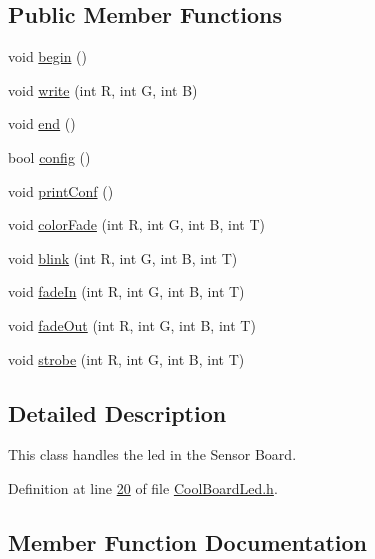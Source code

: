 \subsection*{Public Member Functions}
\begin{DoxyCompactItemize}
\item 
void \hyperlink{class_cool_board_led_ae3cbde8affcc6f011cbd698c8ef911f6}{begin} ()
\item 
void \hyperlink{class_cool_board_led_a30fadd4cbec17ceea428bf7a32207e87}{write} (int R, int G, int B)
\item 
void \hyperlink{class_cool_board_led_a69f323359e0c9f797422f2152b5d41ef}{end} ()
\item 
bool \hyperlink{class_cool_board_led_a1b60e5e30bea96c49ed62ed1bf1ffc8b}{config} ()
\item 
void \hyperlink{class_cool_board_led_a8ed3053a36f0ed4a131f43b5b17efb61}{print\+Conf} ()
\item 
void \hyperlink{class_cool_board_led_a6dbfe23988f43e1242cd05e69b13ff30}{color\+Fade} (int R, int G, int B, int T)
\item 
void \hyperlink{class_cool_board_led_a27706bc029f6a126c55d0b91624ad7fa}{blink} (int R, int G, int B, int T)
\item 
void \hyperlink{class_cool_board_led_aec915442a8441c7cd45c3279d3ff8821}{fade\+In} (int R, int G, int B, int T)
\item 
void \hyperlink{class_cool_board_led_a27c4e14fa2cd3639c0844152cea98887}{fade\+Out} (int R, int G, int B, int T)
\item 
void \hyperlink{class_cool_board_led_adc08c0ac07473499971c503d300f0413}{strobe} (int R, int G, int B, int T)
\end{DoxyCompactItemize}


\subsection{Detailed Description}
This class handles the led in the Sensor Board. 

Definition at line \hyperlink{_cool_board_led_8h_source_l00020}{20} of file \hyperlink{_cool_board_led_8h_source}{Cool\+Board\+Led.\+h}.



\subsection{Member Function Documentation}
\mbox{\label{class_cool_board_led_ae3cbde8affcc6f011cbd698c8ef911f6}} 
